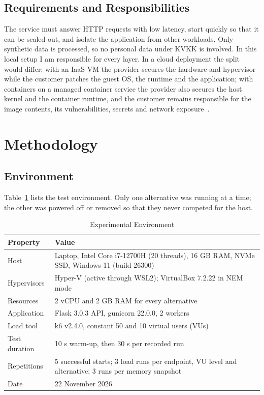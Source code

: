 \documentclass[conference,a4paper]{IEEEtran}
\begin{document}
\subsection{Requirements and Responsibilities}

The service must answer HTTP requests with low latency, start quickly so that it can be scaled out, and isolate the application from other workloads. Only synthetic data is processed, so no personal data under KVKK is involved. In this local setup I am responsible for every layer. In a cloud deployment the split would differ: with an IaaS VM the provider secures the hardware and hypervisor while the customer patches the guest OS, the runtime and the application; with containers on a managed container service the provider also secures the host kernel and the container runtime, and the customer remains responsible for the image contents, its vulnerabilities, secrets and network exposure~\cite{west}.

\section{Methodology}
\label{sec:methodology}

\subsection{Environment}

Table~\ref{tab:environment} lists the test environment. Only one alternative was running at a time; the other was powered off or removed so that they never competed for the host.

\begin{table}[htbp]
	\caption{Experimental Environment}
	\begin{center}
		\footnotesize
		\begin{tabular}{|l|p{}|}
			\hline
			\textbf{Property} & \textbf{Value} \\
			\hline
			Host & Laptop, Intel Core i7-12700H (20 threads), 16 GB RAM, NVMe SSD, Windows 11 (build 26300) \\
			\hline
			Hypervisors & Hyper-V (active through WSL2); VirtualBox 7.2.22 in NEM mode \\
			\hline
			Resources & 2 vCPU and 2 GB RAM for every alternative \\
			\hline
			Application & Flask 3.0.3 API, gunicorn 22.0.0, 2 workers \\
			\hline
			Load tool & k6 v2.4.0, constant 50 and 10 virtual users (VUs) \\
			\hline
			Test duration & 10 s warm-up, then 30 s per recorded run \\
			\hline
			Repetitions & 5 successful starts; 3 load runs per endpoint, VU level and alternative; 3 runs per memory snapshot \\
			\hline
			Date & 22 November 2026 \\
			\hline
		\end{tabular}
		\label{tab:environment}
	\end{center}
\end{table}
\end{document}
